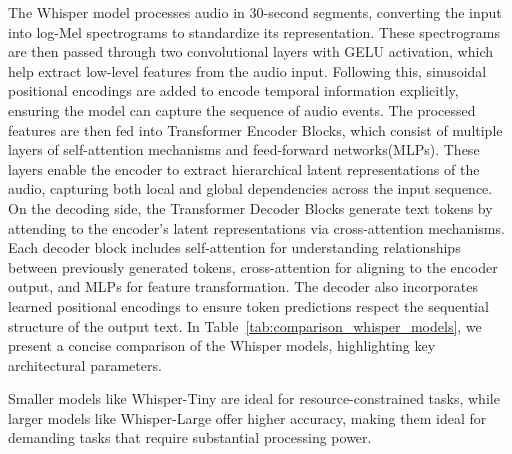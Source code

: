 \documentclass[10pt,twocolumn,letterpaper]{article}
\begin{document}
The Whisper model processes audio in 30-second segments, converting the input into log-Mel spectrograms to standardize its representation. These spectrograms are then passed through two convolutional layers with GELU activation, which help extract low-level features from the audio input. Following this, sinusoidal positional encodings are added to encode temporal information explicitly, ensuring the model can capture the sequence of audio events.
The processed features are then fed into Transformer Encoder Blocks, which consist of multiple layers of self-attention mechanisms and feed-forward networks(MLPs). These layers enable the encoder to extract hierarchical latent representations of the audio, capturing both local and global dependencies across the input sequence.
On the decoding side, the Transformer Decoder Blocks generate text tokens by attending to the encoder’s latent representations via cross-attention mechanisms. Each decoder block includes self-attention for understanding relationships between previously generated tokens, cross-attention for aligning to the encoder output, and MLPs for feature transformation. The decoder also incorporates learned positional encodings to ensure token predictions respect the sequential structure of the output text.
In Table~\ref{tab:comparison_whisper_models}, we present a concise comparison of the Whisper models, highlighting key architectural parameters.

\begin{table}[ht]
\centering
{}
\caption{Comparison of Whisper models}
\label{tab:comparison_whisper_models}
\end{table}

Smaller models like Whisper-Tiny are ideal for resource-constrained tasks, while larger models like Whisper-Large offer higher accuracy, making them ideal for demanding tasks that require substantial processing power. 
\end{document}
